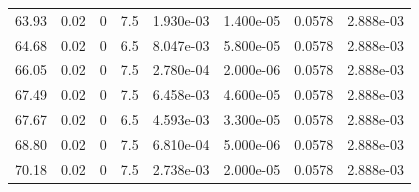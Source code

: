 \documentclass[preview]{standalone}
\begin{document}
{{\begin{tabular}{L{1.2cm}C{1.2cm} C{0.3cm}C{0.5cm} C{1.4cm}C{1.4cm} C{1.4cm}C{1.4cm}}
  63.93  &  0.02  & 0     & 7.5 &  1.930e-03  & 1.400e-05  & 0.0578 &  2.888e-03   \\ 
  64.68  &  0.02  & 0     & 6.5 &  8.047e-03  & 5.800e-05  & 0.0578 &  2.888e-03   \\ 
  66.05  &  0.02  & 0     & 7.5 &  2.780e-04  & 2.000e-06  & 0.0578 &  2.888e-03   \\ 
  67.49  &  0.02  & 0     & 7.5 &  6.458e-03  & 4.600e-05  & 0.0578 &  2.888e-03   \\ 
  67.67  &  0.02  & 0     & 6.5 &  4.593e-03  & 3.300e-05  & 0.0578 &  2.888e-03   \\ 
  68.80  &  0.02  & 0     & 7.5 &  6.810e-04  & 5.000e-06  & 0.0578 &  2.888e-03   \\ 
  70.18  &  0.02  & 0     & 7.5 &  2.738e-03  & 2.000e-05  & 0.0578 &  2.888e-03   \\ 
\hline 
\end{tabular} 

}}
\end{document}
